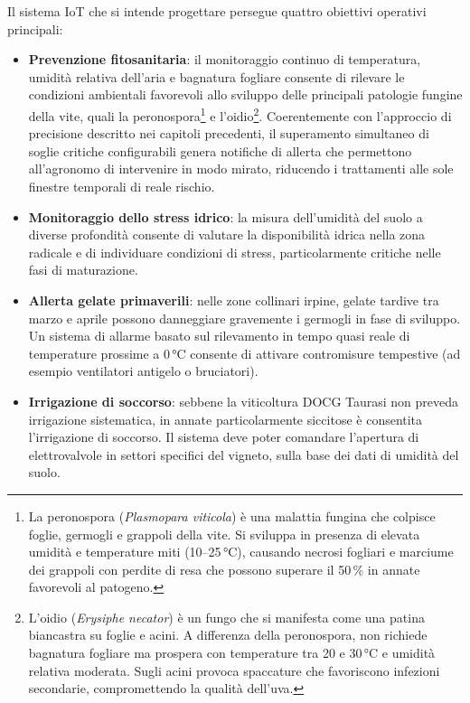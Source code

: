 Il sistema IoT che si intende progettare persegue quattro obiettivi operativi principali:

\begin{itemize}
	\item \textbf{Prevenzione fitosanitaria}: il monitoraggio continuo di temperatura, umidità relativa dell'aria e bagnatura fogliare consente di rilevare le condizioni ambientali favorevoli allo sviluppo delle principali patologie fungine della vite, quali la peronospora\footnote{La peronospora (\textit{Plasmopara viticola}) è una malattia fungina che colpisce foglie, germogli e grappoli della vite. Si sviluppa in presenza di elevata umidità e temperature miti (10--25\,°C), causando necrosi fogliari e marciume dei grappoli con perdite di resa che possono superare il 50\,\% in annate favorevoli al patogeno.} e l'oidio\footnote{L'oidio (\textit{Erysiphe necator}) è un fungo che si manifesta come una patina biancastra su foglie e acini. A differenza della peronospora, non richiede bagnatura fogliare ma prospera con temperature tra 20 e 30\,°C e umidità relativa moderata. Sugli acini provoca spaccature che favoriscono infezioni secondarie, compromettendo la qualità dell'uva.}. Coerentemente con l'approccio di precisione descritto nei capitoli precedenti, il superamento simultaneo di soglie critiche configurabili genera notifiche di allerta che permettono all'agronomo di intervenire in modo mirato, riducendo i trattamenti alle sole finestre temporali di reale rischio.

	\item \textbf{Monitoraggio dello stress idrico}: la misura dell'umidità del suolo a diverse profondità consente di valutare la disponibilità idrica nella zona radicale e di individuare condizioni di stress, particolarmente critiche nelle fasi di maturazione.

	\item \textbf{Allerta gelate primaverili}: nelle zone collinari irpine, gelate tardive tra marzo e aprile possono danneggiare gravemente i germogli in fase di sviluppo. Un sistema di allarme basato sul rilevamento in tempo quasi reale di temperature prossime a 0\,°C consente di attivare contromisure tempestive (ad esempio ventilatori antigelo o bruciatori).

	\item \textbf{Irrigazione di soccorso}: sebbene la viticoltura DOCG Taurasi non preveda irrigazione sistematica, in annate particolarmente siccitose è consentita l'irrigazione di soccorso. Il sistema deve poter comandare l'apertura di elettrovalvole in settori specifici del vigneto, sulla base dei dati di umidità del suolo.
\end{itemize}

